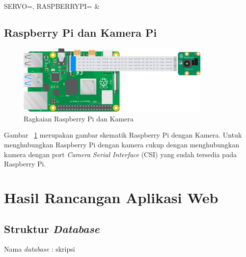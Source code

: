 \begin{atable}
    \caption{Rangkaian pin Servo ke Raspberry Pi}
    \label{table:tableServo}
        {
            SERVO=\SERVO, 
            RASPBERRYPI=\RASPBERRYPI}
        {
            \SERVO & 
            \RASPBERRYPI}
\end{atable}

\subsection{Raspberry Pi dan Kamera Pi}
\begin{figure} [H]
    \includegraphics[width=0.85\textwidth, center]{images/skematik-kamera.png}
    \caption{Ragkaian Raspberry Pi dan Kamera}
    \label{fig:skematikKamera}
\end{figure}

Gambar ~\ref{fig:skematikKamera} merupakan gambar skematik Raspberry Pi dengan Kamera. Untuk menghubungkan Raspberry Pi dengan kamera cukup dengan menghubungkan kamera dengan port \textit{Camera Serial Interface} (CSI) yang sudah tersedia pada Raspberry Pi.


\section{Hasil Rancangan Aplikasi Web}

\subsection{Struktur \textit{Database}}
Nama \textit{database} : skripsi

